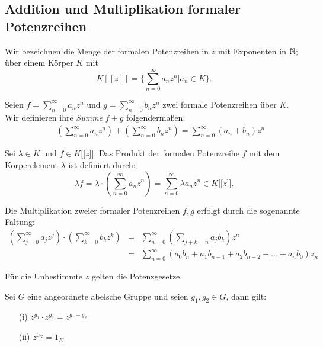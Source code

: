 \subsection{Addition und Multiplikation formaler Potenzreihen} \label{Rechnen}
Wir bezeichnen die Menge der formalen Potenzreihen in $z$ mit Exponenten in $\mathbb{N}_0$ über einem Körper $K$ mit \[K [[z]] = \lbrace \sum_{n=0}^\infty a_n z^n \vert a_n\in K \rbrace. \]
%
%
%
%
\begin{defn}\label{AdditionPotenzreihen}
%
Seien $f = \sum_{n=0}^\infty a_n z^n$ und $g = \sum_{n=0}^\infty b_n z^n$ zwei formale Potenzreihen über $K$. Wir definieren ihre \textit{Summe} $f+g$ folgendermaßen:
\begin{eqnarray*}
&&\left( \sum_{n=0}^\infty a_n z^n \right) + \left( \sum_{n=0}^\infty b_n z^n \right) = \sum_{n=0}^{\infty} (a_n + b_n) z^n 
\end{eqnarray*}
\end{defn}
%
%
% 
\begin{defn}\label{MultiplikationKPotenzreihen}
Sei $\lambda \in K$ und $f \in K\lbrack\lbrack z \rbrack\rbrack$. Das Produkt der formalen Potenzreihe $f$ mit dem Körperelement $\lambda$ ist definiert durch:
\[\lambda f = \lambda\cdot \left(\sum_{n=0}^{\infty}a_nz^n\right) = \sum_{n=0}^{\infty} \lambda a_nz^n \in K\lbrack\lbrack z\rbrack\rbrack. 
\]
\end{defn}
%
%
\begin{defn}\label{MultiplikationPotenzreihen}
Die Multiplikation zweier formaler Potenzreihen $f,g$ erfolgt durch die sogenannte Faltung:
\begin{eqnarray*}
\left( \sum_{j=0}^\infty a_j z^j \right)\cdot \left( \sum_{k=0}^\infty b_k z^k \right) &=&\sum_{n=0}^\infty \left(\sum_{j+k=n} a_j b_k\right) z^n \\
&=& \sum_{n= 0}^\infty \left(a_0b_n + a_1b_{n-1} + a_2b_{n-2} + ... + a_nb_0 \right)z_n
\end{eqnarray*}
\end{defn}
%
Für die Unbestimmte $z$ gelten die Potenzgesetze.
\begin{bem}\label{Potenzgesetze}
Sei $G$ eine angeordnete abelsche Gruppe und seien $g_1, g_2 \in G$, dann gilt:
\begin{itemize}
\item[(i)] $z^{g_1} \cdot z^{g_2} = z^{g_1 + g_2}$
\item[(ii)] $z^{0_G} = 1_K$
\end{itemize}
\end{bem}

